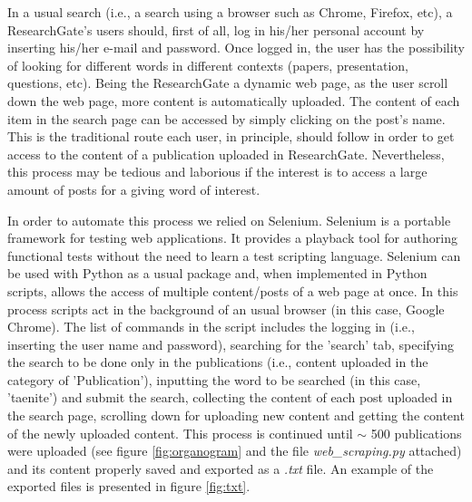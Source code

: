 \documentclass{article}
\begin{document}
In a usual search (i.e., a search using a browser such as Chrome, Firefox, etc), a ResearchGate's users should, first of all, log in his/her personal account by inserting his/her e-mail and password. Once logged in, the user has the possibility of looking for different words in different contexts (papers, presentation, questions, etc). Being the ResearchGate a dynamic web page, as the user scroll down the web page, more content is automatically uploaded. The content of each item in the search page can be accessed by simply clicking on the post's name. This is the traditional route each user, in principle, should follow in order to get access to the content of a publication uploaded in ResearchGate. Nevertheless, this process may be tedious and laborious if the interest is to access a large amount of posts for a giving word of interest.

In order to automate this process we relied on Selenium. Selenium is a portable framework for testing web applications. It provides a playback tool for authoring functional tests without the need to learn a test scripting language. Selenium can be used with Python as a usual package and, when implemented in Python scripts, allows the access of multiple content/posts of a web page at once. In this process scripts act in the background of an usual browser (in this case, Google Chrome). The list of commands in the script includes the logging in (i.e., inserting the user name and password), searching for the 'search' tab, specifying the search to be done only in the publications (i.e., content uploaded in the category of 'Publication'), inputting the word to be searched (in this case, 'taenite') and submit the search, collecting the content of each post uploaded in the search page, scrolling down for uploading new content and getting the content of the newly uploaded content. This process is continued until $\sim$ 500 publications were uploaded (see figure \ref{fig:organogram} and the file \textit{web\_scraping.py} attached) and its content properly saved and exported as a \textit{.txt} file. An example of the exported files is presented in figure \ref{fig:txt}. 
\end{document}
